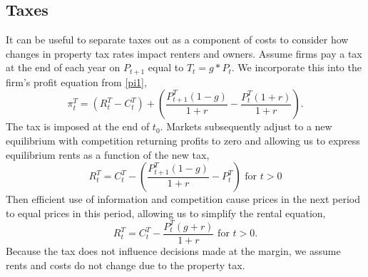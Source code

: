 \documentclass[ecta,nameyear,draft]{econsocart}
\theoremstyle{plain}
\theoremstyle{remark}
\begin{document}
\subsection{Taxes}
It can be useful to separate taxes out as a component of costs to consider how changes in property tax rates impact renters and owners. Assume firms pay a tax at the end of each year on $P_{t+1}$ equal to $T_t=g*P_t$. We incorporate this into the firm's profit equation from \ref{pi1},
\begin{equation}
	\pi^T_t = (R^T_t-C^T_t)+\left(\frac{P^T_{t+1}(1-g)}{1+r}-\frac{P^T_t(1+r)}{1+r}\right).\label{pi1T}
\end{equation}
The tax is imposed at the end of $t_0$. Markets subsequently adjust to a new equilibrium with competition returning profits to zero and allowing us to express equilibrium rents as a function of the new tax,
\begin{equation}
	R^T_t=C^T_t-\left(\frac{P^T_{t+1}(1-g)}{1+r}-P^T_t\right) \text{ for }t>0
\end{equation}
Then efficient use of information and competition cause prices in the next period to equal prices in this period, allowing us to simplify the rental equation,
\begin{equation}
R^T_t=C^T_t-\frac{P^T_{t}(g+r)}{1+r}\text{ for }t>0.
\end{equation}
Because the tax does not influence decisions made at the margin, we assume rents and costs do not change due to the property tax. 
\end{document}
